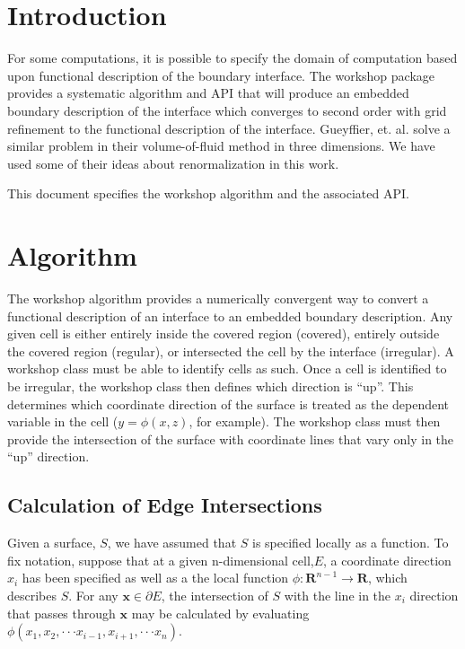 \section{Introduction}

For some computations, it is possible to specify 
the domain of computation based upon functional description
of the boundary interface.  The workshop package
provides a systematic algorithm and API that will
produce an embedded boundary description of the
interface which converges to second order
with grid refinement to the functional description
of the interface.  Gueyffier, et. al. \cite{sandz:1999}
solve a similar problem in their volume-of-fluid method
in three dimensions.  We have used some of their ideas
about renormalization in this work.

This document specifies the workshop algorithm and
the associated  API.  

\section{Algorithm}

The workshop algorithm provides a numerically convergent way to convert a functional description of an interface to an embedded boundary description.  Any given
cell is either entirely inside the covered region (covered),  entirely outside the covered region (regular), or intersected the cell by the interface (irregular).   A workshop class  must be able to identify cells as such.
Once a cell is identified to be irregular, the workshop class then
defines which direction is ``up''.  This determines which coordinate
direction of the surface is treated as the dependent variable 
in the cell ($y = \phi(x,z)$, for example). The workshop class 
must then provide the intersection of the surface with coordinate lines that vary only in the ``up'' direction.   

\subsection{Calculation of Edge Intersections} 
Given a surface, $S$, we have assumed that $S$ is specified locally as a function. To fix notation, suppose that at a given n-dimensional cell,$E$, a coordinate direction $x_{i}$ has been specified as well as a the local function $\phi:\mathbf{R}^{n-1} \rightarrow \mathbf{R}$, which describes $S$. For any $\mathbf {x}\in \partial E$, the intersection of $S$ with the line in the $x_{i}$ direction that passes through $\mathbf {x}$ may be calculated by evaluating  $\phi (x_{1},x_{2}, \cdot \cdot \cdot x_{i-1},x_{i+1}, \cdot \cdot \cdot x_{n})$.

